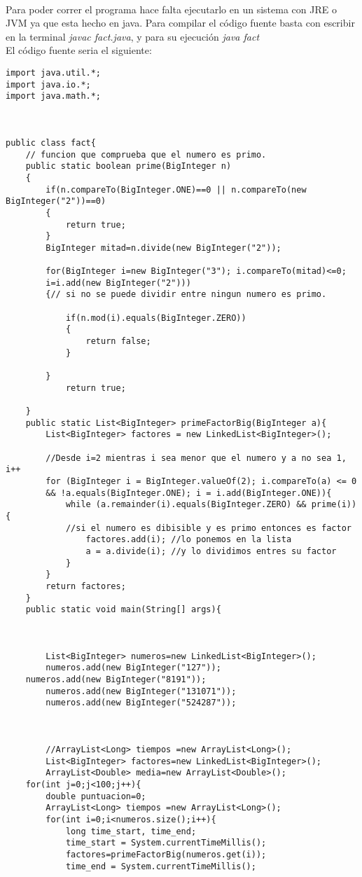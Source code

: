 \\Para poder correr el programa hace falta ejecutarlo en un sistema con JRE o JVM ya que esta hecho en java. Para compilar el código fuente basta con escribir en la terminal \textit{javac fact.java}, y para su ejecución \textit{java fact}
\\El código fuente seria el siguiente:
\begin{verbatim}
import java.util.*;
import java.io.*;
import java.math.*;



public class fact{
    // funcion que comprueba que el numero es primo.
    public static boolean prime(BigInteger n)
    {
        if(n.compareTo(BigInteger.ONE)==0 || n.compareTo(new BigInteger("2"))==0)
        {
            return true;
        }
        BigInteger mitad=n.divide(new BigInteger("2"));

        for(BigInteger i=new BigInteger("3"); i.compareTo(mitad)<=0;
        i=i.add(new BigInteger("2")))
        {// si no se puede dividir entre ningun numero es primo.

            if(n.mod(i).equals(BigInteger.ZERO))
            {
                return false; 
            }

        }
            return true;

    }
    public static List<BigInteger> primeFactorBig(BigInteger a){
        List<BigInteger> factores = new LinkedList<BigInteger>();
       
        //Desde i=2 mientras i sea menor que el numero y a no sea 1, i++
        for (BigInteger i = BigInteger.valueOf(2); i.compareTo(a) <= 0 
        && !a.equals(BigInteger.ONE); i = i.add(BigInteger.ONE)){
            while (a.remainder(i).equals(BigInteger.ZERO) && prime(i)) { 
            //si el numero es dibisible y es primo entonces es factor
                factores.add(i); //lo ponemos en la lista
                a = a.divide(i); //y lo dividimos entres su factor
            }
        }
        return factores;
    }
    public static void main(String[] args){


        
        List<BigInteger> numeros=new LinkedList<BigInteger>();
        numeros.add(new BigInteger("127"));
	numeros.add(new BigInteger("8191"));
        numeros.add(new BigInteger("131071"));
        numeros.add(new BigInteger("524287"));
       
       
     
        //ArrayList<Long> tiempos =new ArrayList<Long>();
        List<BigInteger> factores=new LinkedList<BigInteger>();
        ArrayList<Double> media=new ArrayList<Double>();
	for(int j=0;j<100;j++){
		double puntuacion=0;
		ArrayList<Long> tiempos =new ArrayList<Long>();
		for(int i=0;i<numeros.size();i++){
		    long time_start, time_end;
		    time_start = System.currentTimeMillis();
		    factores=primeFactorBig(numeros.get(i));
		    time_end = System.currentTimeMillis();
		    

\end{verbatim}
